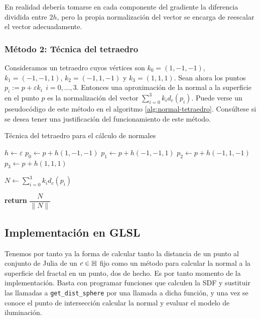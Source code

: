 En realidad debería tomarse en cada componente del gradiente la diferencia dividida entre $2h$, pero la propia normalización del vector se encarga de reescalar el vector adecuadamente.    

\subsubsection{Método 2: Técnica del tetraedro}

Consideramos un tetraedro cuyos vértices son $k_0=(1,-1,-1)$, $k_1=(-1,-1,1)$, $k_2=(-1,1,-1)$ y $k_3=(1,1,1)$. Sean ahora los puntos $p_i := p+\varepsilon k_i\ \ i=0,\dots,3$. Entonces una aproximación de la normal a la superficie en el punto $p$ es la normalización del vector $\sum_{i=0}^3 k_i d_c(p_i)$. Puede verse un pseudocódigo de este método en el algoritmo \ref{alg:normal-tetraedro}. Consúltese \cite{normals-sdf} si se desea tener una justificación del funcionamiento de este método.

\begin{algorithm}[!]
    \caption{Técnica del tetraedro para el cálculo de normales} \label{alg:normal-tetraedro}
    \begin{algorithmic}
    \State $h\gets\varepsilon$
    \State $p_0 \gets p + h(1,-1,-1)$
    \State $p_1 \gets p + h(-1,-1,1)$
    \State $p_2 \gets p + h(-1,1,-1)$
    \State $p_3 \gets p + h(1,1,1)$

    \State $N\gets \sum_{i=0}^3 k_i d_c(p_i)$

    \State \textbf{return} $\dfrac{N}{\|N\|}$
    \EndProcedure
    \end{algorithmic}
\end{algorithm}

\subsection{Implementación en GLSL}

Tenemos por tanto ya la forma de calcular tanto la distancia de un punto al conjunto de Julia de un $c\in\mathbb{H}$ fijo como un método para calcular la normal a la superficie del fractal en un punto, dos de hecho. Es por tanto momento de la implementación. Basta con programar funciones que calculen la SDF y sustituir las llamadas a \verb|get_dist_sphere| por una llamada a dicha función, y una vez se conoce el punto de intersección calcular la normal y evaluar el modelo de iluminación.

